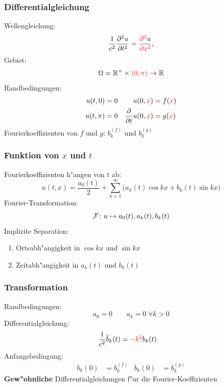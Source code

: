 \begin{frame}
\frametitle{Differentialgleichung}

Wellengleichung:
\[
\frac{1}{c^2}
\frac{\partial^2 u}{\partial t^2}
=
\frac{{\color{red}\partial^2} u}{{\color{red}\partial x^2}},
\]
Gebiet:
\[
\Omega = \mathbb R^+ \times {\color{red}(0,\pi)} \to \mathbb R
\]
Randbedingungen:
\begin{align*}
u(t,   0)&= 0&u(0,{\color{red}x})&=f({\color{red}x})\\
u(t, \pi)&= 0&\frac{\partial}{\partial t}u(0,{\color{red}x})&=g({\color{red}x})
\end{align*}
Fourierkoeffizienten von $f$ und $g$: $b_k^{(f)}$ und $b^{(g)}_k$

\end{frame}

\begin{frame}
\frametitle{Funktion von $x$ und $t$}

Fourierkoeffizienten h"angen von $t$ ab:
\[
u(t,x)=\frac{a_0(t)}2+\sum_{k=1}^\infty \bigl(a_k(t)\cos kx+b_k(t)\sin kx\bigr)
\]
Fourier-Transformation:
\[
{\cal F}\colon
u\mapsto
a_0(t), a_k(t), b_k(t)
\]
Implizite Separation:
\begin{enumerate}
\item Ortsabh"angigkeit in $\cos kx$ und $\sin kx$
\item Zeitabh"angigkeit in $a_k(t)$ und $b_k(t)$
\end{enumerate}

\end{frame}

\begin{frame}
\frametitle{Transformation}
Randbedingungen:
\[
a_0=0\qquad
a_k=0\;\forall k > 0
\]
Differentialgleichung:
\begin{align*}
\frac{1}{c^2}\ddot b_k(t)&= {\color{red}-k^2}b_k(t)
\end{align*}
Anfangsbedingung:
\begin{align*}
b_k(0)&= b_k^{(f)}& \dot b_k(0)&=b_k^{(g)}
\end{align*}
{\bf Gew"ohnliche} Differentialgleichungen f"ur die Fourier-Koeffizienten
\end{frame}

